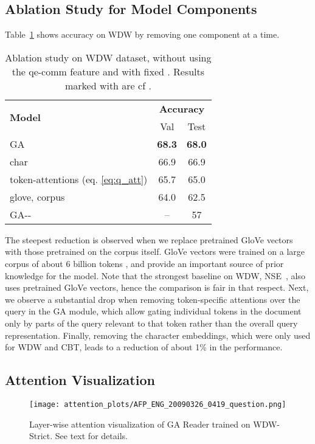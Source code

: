 \documentclass[11pt,a4paper]{article}
\begin{document}
\subsection{Ablation Study for Model Components}
\label{app:ablation}
Table~\ref{tab:ablation} shows accuracy on WDW by removing one component at a time.
\begin{table}[!htbp]
\centering
\caption{\small Ablation study on WDW dataset, without using the qe-comm feature and with fixed . Results marked with  are cf \citet{onishi2016did}.}
\label{tab:ablation}
\begin{tabular}{@{}l|c|c@{}}
\toprule
\multirow{2}{*}{\textbf{Model}} & \multicolumn{2}{c}{\textbf{Accuracy}} \\ \cmidrule(l){2-3} 
                                          & Val                & Test              \\ \midrule
GA                                       & \textbf{68.3}               & \textbf{68.0}             \\
\quad char                               & 66.9               & 66.9              \\
\quad token-attentions (eq. \ref{eq:q_att})  & 65.7               & 65.0              \\
\quad glove, corpus                & 64.0               & 62.5              \\
 \midrule
GA-{}-                & --               & 57              \\ \bottomrule
\end{tabular}
\end{table}
The steepest reduction is observed when we replace pretrained GloVe vectors with those pretrained on the corpus itself. GloVe vectors were trained on a large corpus of about 6 billion tokens \citep{pennington2014glove}, and provide an important source of prior knowledge for the model. Note that the strongest baseline on WDW, NSE~\citep{munkhdalai2016reasoning}, also uses pretrained GloVe vectors, hence the comparison is fair in that respect. Next, we observe a substantial drop when removing token-specific attentions over the query in the GA module, which allow gating individual tokens in the document only by parts of the query relevant to that token rather than the overall query representation. Finally, removing the character embeddings, which were only used for WDW and CBT, leads to a reduction of about 1\% in the performance. 



\subsection{Attention Visualization}
\begin{figure*}[t]
\centering
\caption{Layer-wise attention visualization of GA Reader trained on WDW-Strict. See text for details.}
\texttt{[image: attention\_plots/AFP\_ENG\_20090326\_0419\_question.png]}
\label{fig:att_plots}
\end{figure*}
\end{document}
